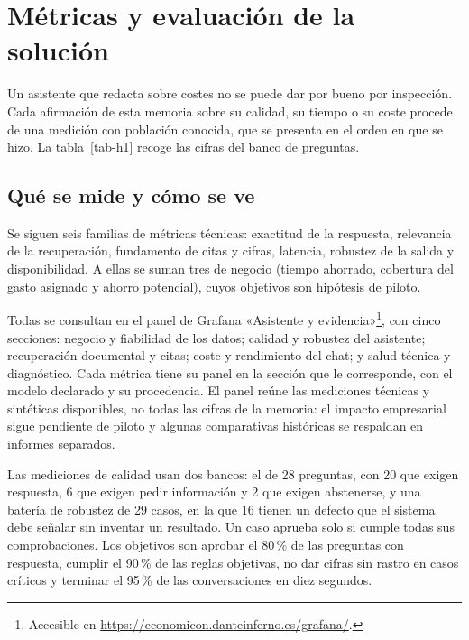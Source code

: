 \section{Métricas y evaluación de la solución}\label{h-0}

Un asistente que redacta sobre costes no se puede dar por bueno por inspección. Cada afirmación de esta memoria sobre su calidad, su tiempo o su coste procede de una medición con población conocida, que se presenta en el orden en que se hizo. La tabla~\ref{tab-h1} recoge las cifras del banco de preguntas.

\subsection{Qué se mide y cómo se ve}\label{h-1}

Se siguen seis familias de métricas técnicas: exactitud de la respuesta, relevancia de la recuperación, fundamento de citas y cifras, latencia, robustez de la salida y disponibilidad. A ellas se suman tres de negocio (tiempo ahorrado, cobertura del gasto asignado y ahorro potencial), cuyos objetivos son hipótesis de piloto. \cite{panel}

Todas se consultan en el panel de Grafana «Asistente y evidencia»\footnote{Accesible en \url{https://economicon.danteinferno.es/grafana/}.}, con cinco secciones: negocio y fiabilidad de los datos; calidad y robustez del asistente; recuperación documental y citas; coste y rendimiento del chat; y salud técnica y diagnóstico. Cada métrica tiene su panel en la sección que le corresponde, con el modelo declarado y su procedencia. El panel reúne las mediciones técnicas y sintéticas disponibles, no todas las cifras de la memoria: el impacto empresarial sigue pendiente de piloto y algunas comparativas históricas se respaldan en informes separados.

Las mediciones de calidad usan dos bancos: el de 28 preguntas, con 20 que exigen respuesta, 6 que exigen pedir información y 2 que exigen abstenerse, y una batería de robustez de 29 casos, en la que 16 tienen un defecto que el sistema debe señalar sin inventar un resultado. Un caso aprueba solo si cumple todas sus comprobaciones. Los objetivos son aprobar el 80\,\% de las preguntas con respuesta, cumplir el 90\,\% de las reglas objetivas, no dar cifras sin rastro en casos críticos y terminar el 95\,\% de las conversaciones en diez segundos. \cite{evaluacion,adr}

